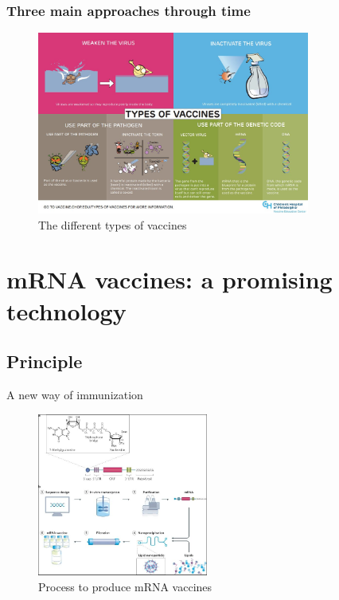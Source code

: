 \begin{frame}
    \frametitle{Three main approaches through time}
    \begin{figure}
        \centering
        \includegraphics[width=0.8\textwidth]{imgs/VaccineGeneration.JPG}
        \caption{The different types of vaccines \autocite{philadelphiaMakingVaccinesHow2014}}
        \label{fig:responses2}
    \end{figure}
\end{frame}

\section{mRNA vaccines: a promising technology}
\subsection{Principle}

\begin{frame}{A new way of immunization}
    
    \begin{figure}
        \centering
        \includegraphics[width=0.5\textwidth]{imgs/mRNA_Vaccine.JPG}
        \caption{Process to produce mRNA vaccines \autocite{MRNAVaccinesInfectious}}
        \label{fig:mRNAvac}
    \end{figure}
    
\end{frame}

